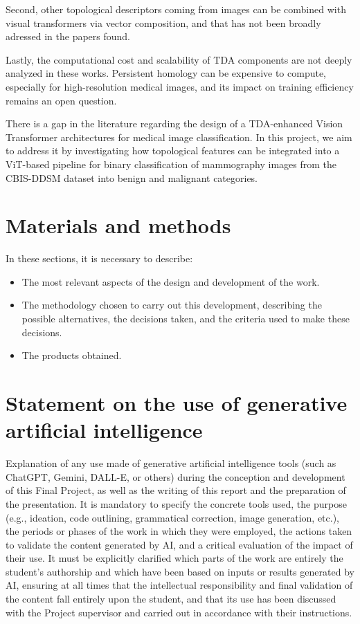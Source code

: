 \documentclass[ENG]{TFUOC}%
\begin{document}
Second, other topological descriptors coming from images can be combined with visual transformers via vector composition, and that has not been broadly adressed in the papers found.

Lastly, the computational cost and scalability of TDA components are not deeply analyzed in these works. Persistent homology can be expensive to compute, especially for high-resolution medical images, and its impact on training efficiency remains an open question.

There is a gap in the literature regarding the design of a TDA-enhanced Vision Transformer architectures for medical image classification. In this project, we aim to address it by investigating how topological features can be integrated into a ViT-based pipeline for binary classification of mammography images from the CBIS-DDSM dataset into benign and malignant categories.

\chapter{Materials and methods}
In these sections, it is necessary to describe:
\begin{itemize}
    \item The most relevant aspects of the design and development of the work.
    \item The methodology chosen to carry out this development, describing the possible alternatives, the decisions taken, and the criteria used to make these decisions.
    \item The products obtained.
\end{itemize}

\chapter{Statement on the use of generative artificial intelligence}

Explanation of any use made of generative artificial intelligence tools (such as ChatGPT, Gemini, DALL-E, or others) during the conception and development of this Final Project, as well as the writing of this report and the preparation of the presentation. It is mandatory to specify the concrete tools used, the purpose (e.g., ideation, code outlining, grammatical correction, image generation, etc.), the periods or phases of the work in which they were employed, the actions taken to validate the content generated by AI, and a critical evaluation of the impact of their use. It must be explicitly clarified which parts of the work are entirely the student's authorship and which have been based on inputs or results generated by AI, ensuring at all times that the intellectual responsibility and final validation of the content fall entirely upon the student, and that its use has been discussed with the Project supervisor and carried out in accordance with their instructions.
\end{document}

